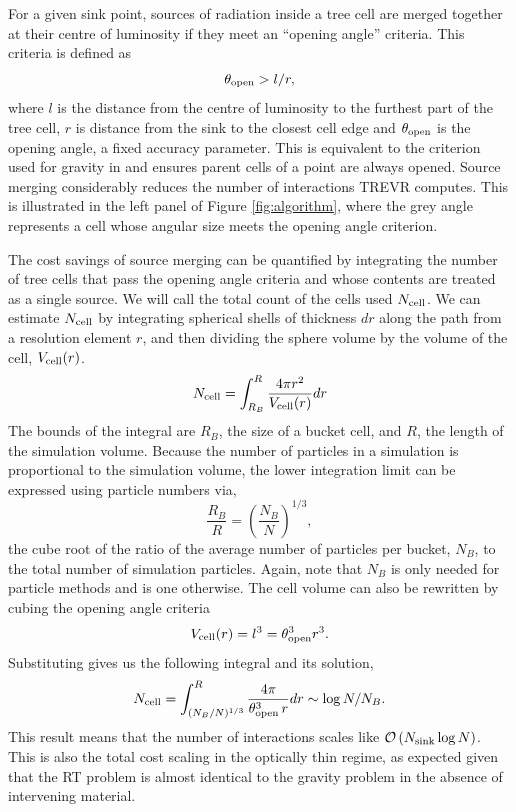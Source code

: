 \documentclass[fleq,usenatbib]{mnras}
\newcommand{\acro}{TREVR}
\newcommand{\bigO}[1]{\mathcal{O}\left(#1\right)}
\newcommand{\NK}{N_{\rm sink}}
\newcommand{\tO}{\theta_{\rm open}}
\begin{document}
{For a given sink point, sources of 
radiation inside a tree cell are merged together at their centre of luminosity if they meet an 
``opening angle'' criteria. This criteria is defined as 
\begin{equation}
\label{eqn:openangle}
\tO > l/r,
\end{equation}
where $l$ is the distance from the centre of luminosity to the furthest part of
the tree cell, $r$ is distance from the sink to the closest cell edge 
and $\tO$ is the opening angle, a fixed accuracy parameter.  This is equivalent to
the criterion used for gravity in \citet{wadsleyEt04} and ensures parent cells
of a point are always opened.  
Source merging considerably reduces the number of 
interactions \acro{} computes. This is illustrated in the left panel of Figure 
\ref{fig:algorithm}, where the grey angle represents a cell whose angular size 
meets the opening angle criterion.

The cost savings of source merging can be quantified by integrating the number 
of tree cells that pass the opening angle criteria and whose contents are treated as a single source.
We will call the total count of the cells used $N_{\rm cell}$. We can
estimate $N_{\rm cell}$ by integrating spherical shells of 
thickness $dr$ along the path from a resolution element $r$, and then dividing 
the sphere volume by the volume of the cell, $V_{\rm cell}(r)$.
\begin{equation}
\label{eqn:nsint}
N_{\rm cell} = \int_{R_B}^R \frac{4\pi r^2}{V_{\rm cell}(r)} dr
\end{equation}
The bounds of the integral are $R_B$, the size of a bucket 
cell, and $R$, the length of the simulation volume. Because the number of 
particles in a simulation is proportional to the simulation volume, the 
lower integration limit can be expressed using particle numbers via,
\begin{equation}
\label{eqn:ratio}
\frac{R_B}{R} = \left(\frac{N_B}{N}\right)^{1/3},
\end{equation} 
the cube root of the ratio of the average number of particles per bucket, 
$N_B$, to the total number of simulation particles. Again, note that $N_B$ is 
only needed for particle methods and is one otherwise. The cell volume 
can also be rewritten by cubing the opening angle criteria
\begin{equation}
\label{eqn:vcell}
V_{\rm cell}(r) = l^3 = \tO^3 r^3.
\end{equation}
Substituting gives us the following integral and its solution,
\begin{equation}
\label{eqn:nssoln}
N_{\rm cell} = \int_{(N_B/N)^{1/3}}^R  \frac{4\pi}{\tO^3\,r} dr
\sim \log{N/N_B}.
\end{equation}
This result means that the number of interactions scales like 
$\bigO{\NK \log N}$. This is also the total cost scaling in the optically 
thin regime, as expected given that the RT problem is almost identical to 
the gravity problem in the absence of intervening material.

}
\end{document}

